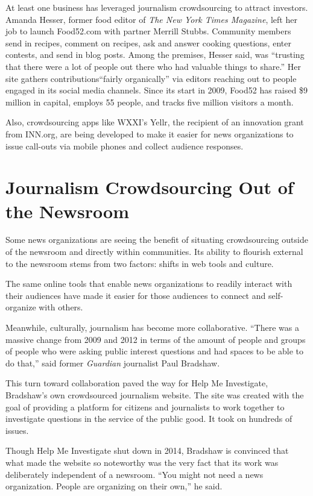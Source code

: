 \documentclass[notoc, symmetric, nobib, nols]{towcenter-guideto-book}
\begin{document}
At least one business has leveraged journalism crowdsourcing to attract investors. Amanda Hesser, former food editor of \textit{The New York Times Magazine}, left her job to launch Food52.com with partner Merrill Stubbs. Community members send in recipes, comment on recipes, ask and answer cooking questions, enter contests, and send in blog posts. Among the premises, Hesser said, was ``trusting that there were a lot of people out there who had valuable things to share.''
Her site gathers contributions``fairly organically'' via editors reaching out to people engaged in its social media channels. Since its start in 2009, Food52 has raised \$9 million in capital, employs 55 people, and tracks five million visitors a month.%

Also, crowdsourcing apps like WXXI's Yellr, the recipient of an innovation grant from INN.org, are being developed to make it easier for news organizations to issue call-outs via mobile phones and collect audience responses. 

\chapter{Journalism Crowdsourcing Out of the Newsroom}

Some news organizations are seeing the benefit of situating crowdsourcing outside of the newsroom and directly within communities. Its ability to flourish external to the newsroom stems from two factors: shifts in web tools and culture. 

The same online tools that enable news organizations to readily interact with their audiences have made it easier for those audiences to connect and self-organize with others.

Meanwhile, culturally, journalism has become more collaborative. ``There was a massive change from 2009 and 2012 in terms of the amount of people and groups of people who were asking public interest questions and had spaces to be able to do that,'' said former \textit{Guardian} journalist Paul Bradshaw.%

This turn toward collaboration paved the way for Help Me Investigate, Bradshaw's own crowdsourced journalism website.\autocite{HMI} The site was created with the goal of providing a platform for citizens and journalists to work together to investigate questions in the service of the public good. It took on hundreds of issues.

Though Help Me Investigate shut down in 2014, Bradshaw is convinced that what made the website so noteworthy was the very fact that its work was deliberately independent of a newsroom. ``You might not need a news organization. People are organizing on their own,'' he said. 
\end{document}
